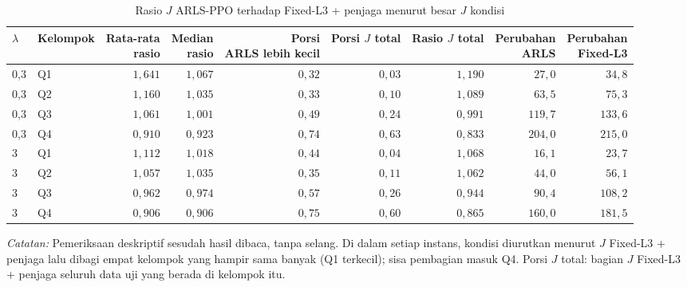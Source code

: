 \begin{table}[htbp]
\caption{Rasio $J$ ARLS-PPO terhadap Fixed-L3 + penjaga menurut besar $J$ kondisi}
\label{tab:uji-kuartil}
\centering\footnotesize
\setlength{\tabcolsep}{4pt}
\begin{adjustbox}{max width=\textwidth}
\begin{tabular}{llrrrrrrr}
\toprule
$\lambda$ & Kelompok & \shortstack[r]{Rata-rata\\rasio} & \shortstack[r]{Median\\rasio} & \shortstack[r]{Porsi\\ARLS lebih kecil} & \shortstack[r]{Porsi $J$\\total} & \shortstack[r]{Rasio\\$J$ total} & \shortstack[r]{Perubahan\\ARLS} & \shortstack[r]{Perubahan\\Fixed-L3} \\
\midrule
0{,}3 & Q1 & $1{,}641$ & $1{,}067$ & $0{,}32$ & $0{,}03$ & $1{,}190$ & $27{,}0$ & $34{,}8$ \\
0{,}3 & Q2 & $1{,}160$ & $1{,}035$ & $0{,}33$ & $0{,}10$ & $1{,}089$ & $63{,}5$ & $75{,}3$ \\
0{,}3 & Q3 & $1{,}061$ & $1{,}001$ & $0{,}49$ & $0{,}24$ & $0{,}991$ & $119{,}7$ & $133{,}6$ \\
0{,}3 & Q4 & $0{,}910$ & $0{,}923$ & $0{,}74$ & $0{,}63$ & $0{,}833$ & $204{,}0$ & $215{,}0$ \\
3 & Q1 & $1{,}112$ & $1{,}018$ & $0{,}44$ & $0{,}04$ & $1{,}068$ & $16{,}1$ & $23{,}7$ \\
3 & Q2 & $1{,}057$ & $1{,}035$ & $0{,}35$ & $0{,}11$ & $1{,}062$ & $44{,}0$ & $56{,}1$ \\
3 & Q3 & $0{,}962$ & $0{,}974$ & $0{,}57$ & $0{,}26$ & $0{,}944$ & $90{,}4$ & $108{,}2$ \\
3 & Q4 & $0{,}906$ & $0{,}906$ & $0{,}75$ & $0{,}60$ & $0{,}865$ & $160{,}0$ & $181{,}5$ \\
\bottomrule
\end{tabular}
\end{adjustbox}
\par\smallskip\footnotesize\textit{Catatan:} Pemeriksaan deskriptif sesudah hasil dibaca, tanpa selang. Di dalam setiap instans, kondisi diurutkan menurut $J$ Fixed-L3 + penjaga lalu dibagi empat kelompok yang hampir sama banyak (Q1 terkecil); sisa pembagian masuk Q4. Porsi $J$ total: bagian $J$ Fixed-L3 + penjaga seluruh data uji yang berada di kelompok itu.
\end{table}
